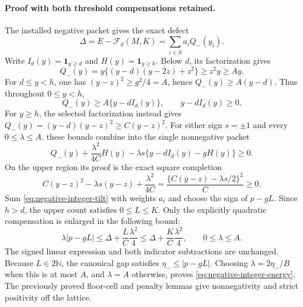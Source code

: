 \paragraph{Proof with both threshold compensations retained.}
The installed negative packet gives the exact defect
\[
 \Delta=E-\mathcal F_d(M,K)=\sum_{i\in S}a_iQ_-(y_i).
\]
Write \(I_d(y)=\mathbf1_{y\ge d}\) and \(H(y)=\mathbf1_{y\ge h}\).
Below \(d\), its factorization gives
\[
 Q_-(y)=y\{(y-d)(y-2z)+z^2\}\ge z^2y\ge Ay.
\]
For \(d\le y<h\), one has \((y-z)^2\ge g^2/4=A\), hence
\(Q_-(y)\ge A(y-d)\).  Thus throughout \(0\le y<h\),
\[
 Q_-(y)\ge A\{y-dI_d(y)\},\qquad y-dI_d(y)\ge0.
\]
For \(y\ge h\), the selected factorization instead gives
\(Q_-(y)=(y-d)(y-z)^2\ge C(y-z)^2\).
For either sign \(s=\pm1\) and every \(0\le\lambda\le A\), these bounds
combine into the single nonnegative packet
\begin{equation}
 Q_-(y)+\frac{\lambda^2}{4C}H(y)
  -\lambda s\{y-dI_d(y)-gH(y)\}\ge0.
 \label{eq:negative-integer-tilt}
\end{equation}
On the upper region its proof is the exact square completion
\[
 C(y-z)^2-\lambda s(y-z)+\frac{\lambda^2}{4C}
 =\frac{\{C(y-z)-\lambda s/2\}^2}{C}\ge0.
\]
Sum \eqref{eq:negative-integer-tilt} with weights \(a_i\) and choose the
sign of \(p-gL\).  Since \(h>d\), the upper count satisfies \(0\le L\le K\).
Only the explicitly quadratic compensation is enlarged in the following bound:
\begin{equation}
 \lambda|p-gL|\le\Delta+\frac{L}{C}\frac{\lambda^2}{4}
 \le\Delta+\frac{K}{C}\frac{\lambda^2}{4},\qquad0\le\lambda\le A.
 \label{eq:negative-integer-joint}
\end{equation}
The signed linear expression and both indicator subtractions are unchanged.
Because \(L\in2\mathbb N\), the canonical gap satisfies
\(\eta_-\le|p-gL|\).  Choosing \(\lambda=2\eta_-/B\) when this is at most
\(A\), and \(\lambda=A\) otherwise, proves
\eqref{eq:negative-integer-energy}.  The previously proved floor-cell and
penalty lemmas give nonnegativity and strict positivity off the lattice.

